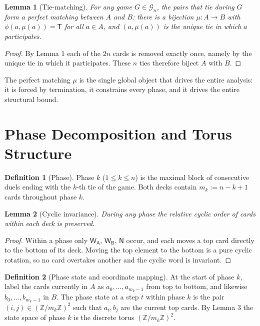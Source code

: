 \documentclass[11pt]{article}
\newtheorem{lemma}{Lemma}
\theoremstyle{definition}
\newtheorem{definition}{Definition}
\theoremstyle{remark}
\newcommand{\WA}{\mathsf{W_A}}
\newcommand{\WB}{\mathsf{W_B}}
\newcommand{\TT}{\mathsf{T}}
\newcommand{\NN}{\mathsf{N}}
\begin{document}
\begin{lemma}[Tie-matching]
For any game $G\in\mathcal{G}_n$, the pairs that tie during $G$ form a perfect matching between $A$ and $B$: there is a bijection $\mu:A\rightarrow B$ with $\phi(a,\mu(a))=\TT$ for all $a\in A$, and $(a,\mu(a))$ is the unique tie in which $a$ participates.
\end{lemma}
\begin{proof}
By Lemma 1 each of the $2n$ cards is removed exactly once, namely by the unique tie in which it participates. These $n$ ties therefore biject $A$ with $B$.
\end{proof}

The perfect matching $\mu$ is the single global object that drives the entire analysis: it is forced by termination, it constrains every phase, and it drives the entire structural bound.

\section{Phase Decomposition and Torus Structure}\label{sec:phase}
\begin{definition}[Phase] Phase $k$ ($1\le k\le n$) is the maximal block of consecutive duels ending with the $k$-th tie of the game. Both decks contain $m_k:=n-k+1$ cards throughout phase $k$.
\end{definition}

\begin{lemma}[Cyclic invariance] During any phase the relative cyclic order of cards within each deck is preserved.
\end{lemma}
\begin{proof}
Within a phase only $\WA$, $\WB$, $\NN$ occur, and each moves a top card directly to the bottom of its deck. Moving the top element to the bottom is a pure cyclic rotation, so no card overtakes another and the cyclic word is invariant.
\end{proof}

\begin{definition}[Phase state and coordinate mapping] At the start of phase $k$, label the cards currently in $A$ as $a_0,\dots,a_{m_k-1}$ from top to bottom, and likewise $b_0,\dots,b_{m_k-1}$ in $B$. The phase state at a step $t$ within phase $k$ is the pair $(i,j)\in(\mathbb{Z}/m_k\mathbb{Z})^2$ such that $a_i, b_j$ are the current top cards. By Lemma 3 the state space of phase $k$ is the discrete torus $(\mathbb{Z}/m_k\mathbb{Z})^2$.
\end{definition}
\end{document}
